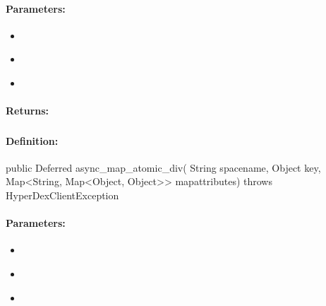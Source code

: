 \paragraph{Parameters:}
\begin{itemize}[noitemsep]
\item {}\\

\item {}\\

\item {}\\

\end{itemize}

\paragraph{Returns:}


\pagebreak
\subsubsection{}
\label{api:java:async_map_atomic_div}


\paragraph{Definition:}
\begin{javacode}
public Deferred async_map_atomic_div(
        String spacename,
        Object key,
        Map<String, Map<Object, Object>> mapattributes) throws HyperDexClientException
\end{javacode}

\paragraph{Parameters:}
\begin{itemize}[noitemsep]
\item {}\\

\item {}\\

\item {}\\

\end{itemize}

